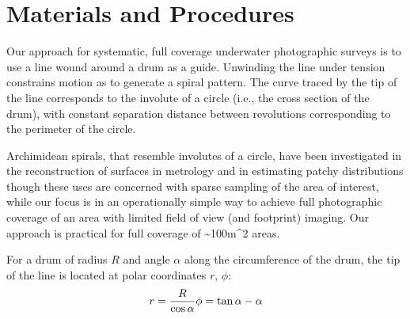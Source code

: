 \section{Materials and Procedures}

Our approach for systematic, full coverage underwater photographic surveys is to use a line wound around a drum as a guide. Unwinding the line under tension constrains motion as to generate a spiral pattern. The curve traced by the tip of the line corresponds to the involute of a circle (i.e., the cross section of the drum), with constant separation distance between revolutions corresponding to the perimeter of the circle. 

Archimidean spirals, that resemble involutes of a circle, have been investigated in the reconstruction of surfaces in metrology \cite{Wieczorowski_2001} and in estimating patchy distributions \cite{Kalikhman_2006} though these uses are concerned with sparse sampling of the area of interest, while our focus is in an operationally simple way to achieve full photographic coverage of an area with limited field of view (and footprint) imaging. Our approach is practical for full coverage of \sim{100m^{2}} areas.

For a drum of radius $R$ and angle $\alpha$ along the circumference of the drum, the tip of the line is located at polar coordinates $r$, $\phi$:  
\begin{equation}
r = \frac{R}{\cos\alpha} \\
\phi = \tan\alpha - \alpha
\end{equation}

